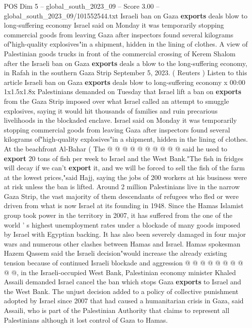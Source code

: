 \begin{textsample}{POS Dim 5 – global\_south\_2023\_09 – Score 3.00 – global\_south\_2023\_09/101552544.txt}  \label{ex:f5_pos_423}
Israeli ban on Gaza \textbf{exports} deals blow to long-suffering economy Israel said on Monday it was temporarily stopping commercial goods from leaving Gaza after inspectors found several kilograms of"high-quality explosives"in a shipment, hidden in the lining of clothes.
A view of Palestinian goods trucks in front of the commercial crossing of Kerem Shalom after the Israeli ban on Gaza \textbf{exports} deals a blow to the long-suffering economy, in Rafah in the southern Gaza Strip September 5, 2023. ( Reuters ) Listen to this article Israeli ban on Gaza \textbf{exports} deals blow to long-suffering economy x 00:00 1x1.5x1.8x Palestinians demanded on Tuesday that Israel lift a ban on \textbf{exports} from the Gaza Strip imposed over what Israel called an attempt to smuggle explosives, saying it would hit thousands of families and ruin precarious livelihoods in the blockaded enclave.
Israel said on Monday it was temporarily stopping commercial goods from leaving Gaza after inspectors found several kilograms of"high-quality explosives"in a shipment, hidden in the lining of clothes.
At the beachfront Al-Bahar ( The @ @ @ @ @ @ @ @ @ @ said he used to \textbf{export} 20 tons of fish per week to Israel and the West Bank."The fish in fridges will decay if we can't \textbf{export} it, and we will be forced to sell the fish of the farm at the lowest prices,"said Hajj, saying the jobs of 200 workers at his business were at risk unless the ban is lifted.
Around 2 million Palestinians live in the narrow Gaza Strip, the vast majority of them descendants of refugees who fled or were driven from what is now Israel at its founding in 1948.
Since the Hamas Islamist group took power in the territory in 2007, it has suffered from the one of the world ' s highest unemployment rates under a blockade of many goods imposed by Israel with Egyptian backing.
It has also been severely damaged in four major wars and numerous other clashes between Hamas and Israel.
Hamas spokesman Hazem Qassem said the Israeli decision"would increase the already existing tension because of continued Israeli blockade and aggression @ @ @ @ @ @ @ @ @ @, in the Israeli-occupied West Bank, Palestinian economy minister Khaled Assaili demanded Israel cancel the ban which stops Gaza \textbf{exports} to Israel and the West Bank.
The unjust decision added to a policy of collective punishment adopted by Israel since 2007 that had caused a humanitarian crisis in Gaza, said Assaili, who is part of the Palestinian Authority that claims to represent all Palestinians although it lost control of Gaza to Hamas.

\end{textsample}
